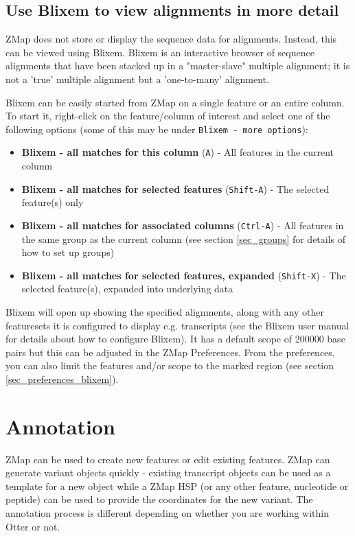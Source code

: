 \documentclass[letterpaper]{article}
\begin{document}
\subsection{Use Blixem to view alignments in more detail} \label{sec_blixem}
ZMap does not store or display the sequence data for alignments. Instead, this can be viewed using Blixem. Blixem is an interactive browser of sequence alignments that have been stacked up in a "master-slave" multiple alignment; it is not a 'true' multiple alignment but a 'one-to-many' alignment.

Blixem can be easily started from ZMap on a single feature or an entire column. To start it, right-click on the feature/column of interest and select one of the following options (some of this may be under \lstinline{Blixem - more options}):
\begin{itemize}
\item \textbf{Blixem - all matches for this column} (\lstinline{A}) - All features in the current column
\item \textbf{Blixem - all matches for selected features} (\lstinline{Shift-A}) - The selected feature(s) only
\item \textbf{Blixem - all matches for associated columns} (\lstinline{Ctrl-A}) - All features in the same group as the current column (see section \ref{sec_groups} for details of how to set up groups)
\item \textbf{Blixem - all matches for selected features, expanded} (\lstinline{Shift-X}) - The selected feature(s), expanded into underlying data
\end{itemize}

Blixem will open up showing the specified alignments, along with any other featuresets it is configured to display e.g. transcripts (see the Blixem user manual for details about how to configure Blixem). It has a default scope of 200000 base pairs but this can be adjusted in the ZMap Preferences. From the preferences, you can also limit the features and/or scope to the marked region (see section \ref{sec_preferences_blixem}).


\clearpage
\section{Annotation} \label{sec_annotation}
ZMap can be used to create new features or edit existing features. ZMap can generate variant objects quickly - existing transcript objects can be used as a template for a new object while a ZMap HSP (or any other feature, nucleotide or peptide) can be used to provide the coordinates for the new variant. The annotation process is different depending on whether you are working within Otter or not.
\end{document}
